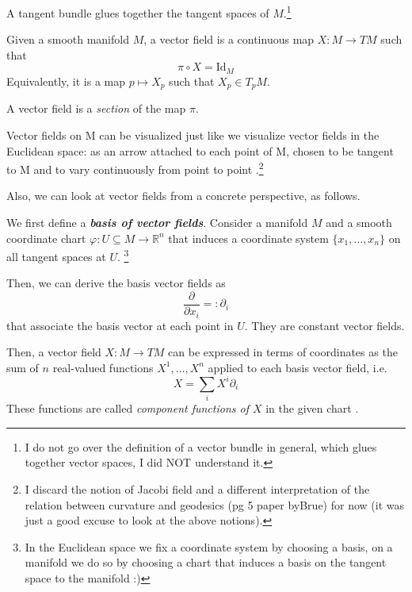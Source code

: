 \documentclass[a4paper,12pt,reqno]{amsbook}
\theoremstyle{definition} %
\newcommand{\1}{\mathbbm{1}}
\newcommand{\R}{\ensuremath{\mathbb{R}}}
\theoremstyle{plain}
\theoremstyle{remark}
\begin{document}
A tangent bundle glues together the tangent spaces of $M$.\footnote{I do not go over the definition of a vector bundle in general, which glues together vector spaces, I did NOT understand it.} 


\begin{definition}
    Given a smooth manifold $M$, a vector field is a continuous map $X:M \to TM$ such that 
    \[
    \pi \circ X = \text{Id}_M
    \]
    Equivalently, it is a map $p \mapsto X_p $ such that $X_p \in T_pM$.
\end{definition}
\begin{remark}
    A vector field is a \emph{section} of the map $\pi$. 
\end{remark}
Vector fields on M can be visualized just like we visualize vector fields in the Euclidean space: as an arrow attached to each point of M, chosen to be tangent to M and to vary continuously from point to point \cite{lee2003smooth}.\footnote{I discard the notion of Jacobi field and a different interpretation of the relation between curvature and geodesics (pg 5 paper byBrue) for now (it was just a good excuse to look at the above notions).} 

Also, we can look at vector fields from a concrete perspective, as follows.

We first define a \textbf{\emph{basis of vector fields}}. Consider a manifold $M$ and a smooth coordinate chart $\varphi:U \subseteq M \to \R^n $  that induces a coordinate system $\{x_1,\ldots,x_n\}$ on all tangent spaces at $U$. \footnote{In the Euclidean space we fix a coordinate system by choosing a basis, on a manifold we do so by choosing a chart that induces a basis on the tangent space to the manifold :)} 

Then, we can derive the basis vector fields as \[
    \frac{\partial}{\partial x_i} =: \partial_i
    \]
    that associate the basis vector at each point in $U$. They are constant vector fields. 
    

Then, a vector field $X:M\to TM$ can be expressed in terms of coordinates as the sum of $n$ real-valued functions $X^1, \ldots,X^n $ applied to each basis vector field, i.e.\[
    X=\sum_iX^i \partial_i
    \]
These functions are called \textit{component functions of $X$} in the given chart \cite{lee2003smooth}.
\end{document}
